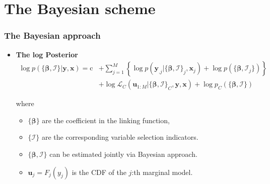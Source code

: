 \documentclass[10pt,aspectratio=169]{beamer}
\begin{document}
\section{The Bayesian scheme}


\begin{frame}%
  \frametitle{The Bayesian approach}
  \begin{itemize}

  \item \textbf{The log Posterior}
    \[
    \begin{split}\log p(\{\bm{\beta},\bm{\mathcal{I}}\}|\bm{y},\bm{x})=
      \mathrm{c}&+\sum\nolimits _{j=1}^{M}\left\{\log
        p(\bm{y}_{.j}|\{\bm{\beta},\bm{\mathcal{I}}\}_{j},\bm{x}_{j}) + \log p(\{\bm{\beta},\bm{\mathcal{I}}_j\}) \right\}\\
      & +\log\mathcal{L}_{C}(\bm{u}_{1:M}|\{\bm{\beta},\bm{\mathcal{I}}\}_{C},\bm{y},\bm{x})+
      \log p_C(\{\bm{\beta},\bm{\mathcal{I}}\})
    \end{split}
    \]

    where
    \begin{itemize}
    \item $\{\bm{\beta}\}$ are the coefficient in the linking function,
    \item $\{\bm{\mathcal{I}}\}$ are the corresponding variable selection indicators.
    \item $\{\bm{\beta},\bm{\mathcal{I}}\}$ can be estimated jointly via Bayesian approach.
    \item $\bm{u}_{j}=F_{j}(y_{j})$ is the CDF of the $j$:th marginal model.
    \end{itemize}


  \end{itemize}
\end{frame}
\end{document}
